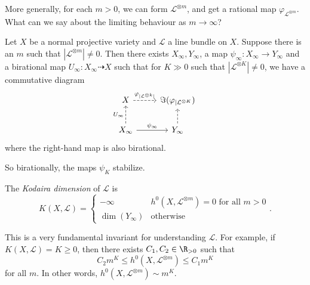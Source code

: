 \documentclass[a4paper]{article}
\begin{document}
More generally, for each $m > 0$, we can form $\mathcal{L}^{\otimes m}$, and get a rational map $\varphi_{\mathcal{L}^{\otimes m}}$. What can we say about the limiting behaviour as $m \to \infty$?
%

\begin{thm}[Iitaka]
  Let $X$ be a normal projective variety and $\mathcal{L}$ a line bundle on $X$. Suppose there is an $m$ such that $|\mathcal{L}^{\otimes m}| \not= 0$. Then there exists $X_\infty, Y_\infty$, a map $\psi_\infty: X_\infty \to Y_\infty$ and a birational map $U_\infty: X_\infty \dashrightarrow X$ such that for $K \gg 0$ such that $|\mathcal{L}^{\otimes K}| \not= 0$, we have a commutative diagram
  \[
    \begin{tikzcd}
      X \ar[r, dashed, "\varphi_{|\mathcal{L}^{\otimes k}|}"] & \Im (\varphi_{|\mathcal{L}^{\otimes K}})\\
      X_\infty \ar[u, "U_\infty", dashed] \ar[r, "\psi_\infty"] & Y_\infty \ar[u, dashed]
    \end{tikzcd}
  \]
  where the right-hand map is also birational.
\end{thm}
So birationally, the maps $\psi_K$ stabilize.

\begin{defi}
  The \emph{Kodaira dimension} of $\mathcal{L}$ is
  \[
    K(X, \mathcal{L}) =
    \begin{cases}
      -\infty & h^0(X, \mathcal{L}^{\otimes m}) = 0\text{ for all }m > 0\\
      \dim (Y_\infty) & \text{otherwise}
    \end{cases}.
  \]
\end{defi}
This is a very fundamental invariant for understanding $\mathcal{L}$. For example, if $K(X, \mathcal{L}) = K \geq 0$, then there exists $C_1, C_2 \in \R_{>0}$ such that
\[
  C_2 m^K \leq h^0(X, \mathcal{L}^{\otimes m}) \leq C_1 m^K
\]
for all $m$. In other words, $h^0(X, \mathcal{L}^{\otimes m}) \sim m^K$.

\printindex
\end{document}
